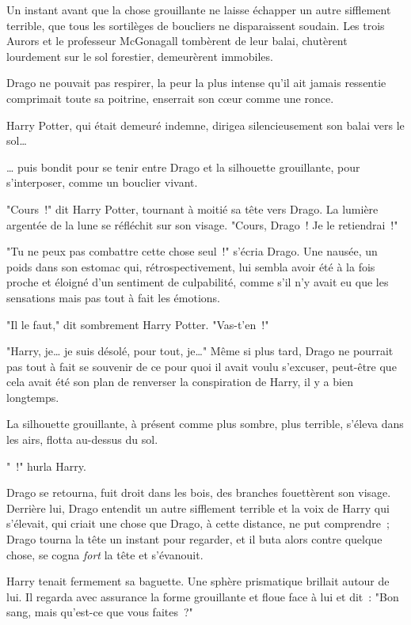 \begin{em}
Un instant avant que la chose grouillante ne laisse échapper un autre sifflement terrible, que tous les sortilèges de boucliers ne disparaissent soudain. Les trois Aurors et le professeur McGonagall tombèrent de leur balai, chutèrent lourdement sur le sol forestier, demeurèrent immobiles.

Drago ne pouvait pas respirer, la peur la plus intense qu'il ait jamais ressentie comprimait toute sa poitrine, enserrait son cœur comme une ronce.

Harry Potter, qui était demeuré indemne, dirigea silencieusement son balai vers le sol…

… puis bondit pour se tenir entre Drago et la silhouette grouillante, pour s'interposer, comme un bouclier vivant.

"Cours~!" dit Harry Potter, tournant à moitié sa tête vers Drago. La lumière argentée de la lune se réfléchit sur son visage. "Cours, Drago~! Je le retiendrai~!"

"Tu ne peux pas combattre cette chose seul~!" s'écria Drago. Une nausée, un poids dans son estomac qui, rétrospectivement, lui sembla avoir été à la fois proche et éloigné d'un sentiment de culpabilité, comme s'il n'y avait eu que les sensations mais pas tout à fait les émotions.

"Il le faut," dit sombrement Harry Potter. "Vas-t'en~!"

"Harry, je… je suis désolé, pour tout, je…" Même si plus tard, Drago ne pourrait pas tout à fait se souvenir de ce pour quoi il avait voulu s'excuser, peut-être que cela avait été son plan de renverser la conspiration de Harry, il y a bien longtemps.

La silhouette grouillante, à présent comme plus sombre, plus terrible, s'éleva dans les airs, flotta au-dessus du sol.

"~!" hurla Harry.

Drago se retourna, fuit droit dans les bois, des branches fouettèrent son visage. Derrière lui, Drago entendit un autre sifflement terrible et la voix de Harry qui s'élevait, qui criait une chose que Drago, à cette distance, ne put comprendre~; Drago tourna la tête un instant pour regarder, et il buta alors contre quelque chose, se cogna \emph{fort} la tête et s'évanouit.
\end{em}

\later

Harry tenait fermement sa baguette. Une sphère prismatique brillait autour de lui. Il regarda avec assurance la forme grouillante et floue face à lui et dit~: "Bon sang, mais qu'est-ce que vous faites~?"

